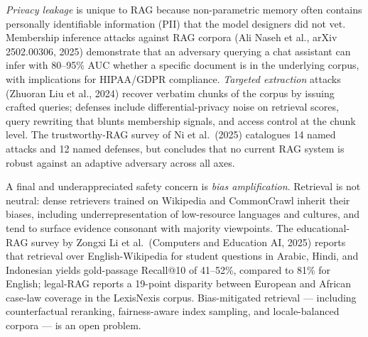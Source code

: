 \documentclass{article}
\begin{document}
\emph{Privacy leakage} is unique to RAG because non-parametric memory often contains personally identifiable information (PII) that the model designers did not vet. Membership inference attacks against RAG corpora (Ali Naseh et al., arXiv 2502.00306, 2025) demonstrate that an adversary querying a chat assistant can infer with 80--95\% AUC whether a specific document is in the underlying corpus, with implications for HIPAA/GDPR compliance. \emph{Targeted extraction} attacks (Zhuoran Liu et al., 2024) recover verbatim chunks of the corpus by issuing crafted queries; defenses include differential-privacy noise on retrieval scores, query rewriting that blunts membership signals, and access control at the chunk level. The trustworthy-RAG survey of Ni et al.~(2025) catalogues 14 named attacks and 12 named defenses, but concludes that no current RAG system is robust against an adaptive adversary across all axes.

A final and underappreciated safety concern is \emph{bias amplification}. Retrieval is not neutral: dense retrievers trained on Wikipedia and CommonCrawl inherit their biases, including underrepresentation of low-resource languages and cultures, and tend to surface evidence consonant with majority viewpoints. The educational-RAG survey by Zongxi Li et al.~(Computers and Education AI, 2025) reports that retrieval over English-Wikipedia for student questions in Arabic, Hindi, and Indonesian yields gold-passage Recall@10 of 41--52\%, compared to 81\% for English; legal-RAG \citep{hindi20252025} reports a 19-point disparity between European and African case-law coverage in the LexisNexis corpus. Bias-mitigated retrieval --- including counterfactual reranking, fairness-aware index sampling, and locale-balanced corpora --- is an open problem.
\end{document}
